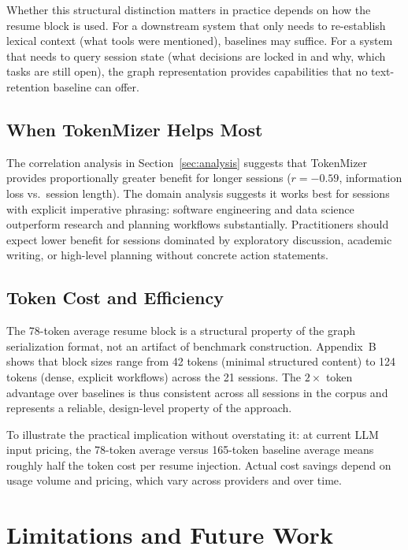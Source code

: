 \documentclass[journal]{IEEEtran}
\begin{document}
Whether this structural distinction matters in practice
depends on how the resume block is used. For a downstream
system that only needs to re-establish lexical context
(what tools were mentioned), baselines may suffice.
For a system that needs to query session state (what
decisions are locked in and why, which tasks are still
open), the graph representation provides capabilities that
no text-retention baseline can offer.

\subsection{When TokenMizer Helps Most}

The correlation analysis in Section~\ref{sec:analysis}
suggests that TokenMizer provides proportionally greater
benefit for longer sessions ($r = -0.59$, information loss
vs.\ session length).
The domain analysis suggests it works best for sessions with
explicit imperative phrasing: software engineering and
data science outperform research and planning workflows
substantially.
Practitioners should expect lower benefit for sessions
dominated by exploratory discussion, academic writing, or
high-level planning without concrete action statements.

\subsection{Token Cost and Efficiency}

The 78-token average resume block is a structural property
of the graph serialization format, not an artifact of
benchmark construction.
Appendix~B shows that block sizes range from 42 tokens
(minimal structured content) to 124 tokens (dense,
explicit workflows) across the 21 sessions.
The $2\times$ token advantage over baselines is thus
consistent across all sessions in the corpus and represents
a reliable, design-level property of the approach.

To illustrate the practical implication without overstating
it: at current LLM input pricing, the 78-token average
versus 165-token baseline average means roughly half the
token cost per resume injection. Actual cost savings depend
on usage volume and pricing, which vary across providers
and over time.

\section{Limitations and Future Work}
\label{sec:limitations}
\end{document}
